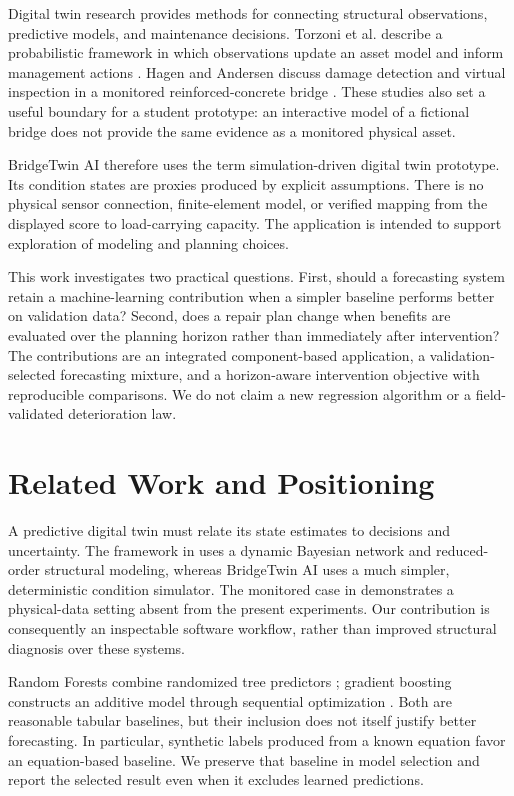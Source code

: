 \documentclass[conference]{IEEEtran}
\begin{document}
Digital twin research provides methods for connecting structural observations, predictive models, and maintenance decisions. Torzoni et al. describe a probabilistic framework in which observations update an asset model and inform management actions \cite{torzoni}. Hagen and Andersen discuss damage detection and virtual inspection in a monitored reinforced-concrete bridge \cite{hagen}. These studies also set a useful boundary for a student prototype: an interactive model of a fictional bridge does not provide the same evidence as a monitored physical asset.

BridgeTwin AI therefore uses the term simulation-driven digital twin prototype. Its condition states are proxies produced by explicit assumptions. There is no physical sensor connection, finite-element model, or verified mapping from the displayed score to load-carrying capacity. The application is intended to support exploration of modeling and planning choices.

This work investigates two practical questions. First, should a forecasting system retain a machine-learning contribution when a simpler baseline performs better on validation data? Second, does a repair plan change when benefits are evaluated over the planning horizon rather than immediately after intervention? The contributions are an integrated component-based application, a validation-selected forecasting mixture, and a horizon-aware intervention objective with reproducible comparisons. We do not claim a new regression algorithm or a field-validated deterioration law.

\section{Related Work and Positioning}
A predictive digital twin must relate its state estimates to decisions and uncertainty. The framework in \cite{torzoni} uses a dynamic Bayesian network and reduced-order structural modeling, whereas BridgeTwin AI uses a much simpler, deterministic condition simulator. The monitored case in \cite{hagen} demonstrates a physical-data setting absent from the present experiments. Our contribution is consequently an inspectable software workflow, rather than improved structural diagnosis over these systems.

Random Forests combine randomized tree predictors \cite{breiman}; gradient boosting constructs an additive model through sequential optimization \cite{friedman}. Both are reasonable tabular baselines, but their inclusion does not itself justify better forecasting. In particular, synthetic labels produced from a known equation favor an equation-based baseline. We preserve that baseline in model selection and report the selected result even when it excludes learned predictions.
\end{document}
